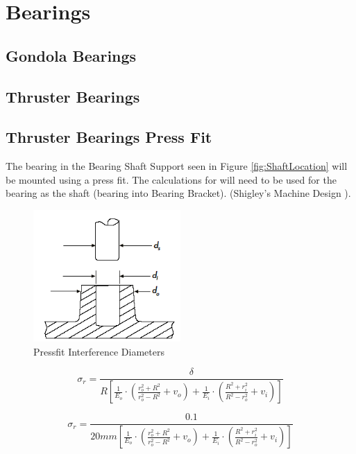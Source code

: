 \documentclass[../main.tex]{subfiles}
\begin{document}
\section{Bearings} \label{Bearings}
\subsection{Gondola Bearings}

\subsection{Thruster Bearings}

\subsection{Thruster Bearings Press Fit}
The bearing in the Bearing Shaft Support seen in Figure \ref{fig:ShaftLocation} will be mounted using a press fit. The calculations \cite{pressfit} for will need to be used for the bearing as the shaft (bearing into Bearing Bracket). {(Shigley's Machine Design \cite[116]{shigley})}.

\begin{figure}[H]
	\centering
	\includegraphics[width=0.5\textwidth]{img/analysis/thruster/pressfit.png}
	\caption{Pressfit Interference Diameters \cite{pressfit}}
	\label{fig:pressfit}
\end{figure}

\begin{equation}
\sigma_r=\frac{\delta}{R[\frac{1}{E_o}\cdot{}(\frac{r_o^2+R^2}{r_o^2-R^2}+v_o)+\frac{1}{E_i}\cdot{}(\frac{R^2+r_i^2}{R^2-r_o^2}+v_i)]}
\end{equation}

\begin{equation}
\sigma_r=\frac{0.1}{20mm[\frac{1}{E_o}\cdot{}(\frac{r_o^2+R^2}{r_o^2-R^2}+v_o)+\frac{1}{E_i}\cdot{}(\frac{R^2+r_i^2}{R^2-r_o^2}+v_i)]}
\end{equation}
\end{document}
